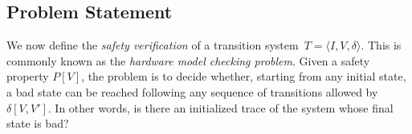 \subsection{Problem Statement} 

We now define the \textit{safety verification} of a transition system~$T = \langle I,V,\delta\rangle$.
This is commonly known as the \textit{hardware model checking problem}.  
Given a safety property $P[V]$, the problem is to decide whether, starting from any initial state, a bad state can be reached following any sequence of transitions allowed by $\delta[V,V']$. In other words, is there an initialized trace of the system whose final state is bad?

